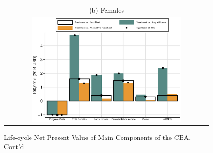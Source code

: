 \documentclass[static]{JJH-Beamer}
\begin{document}
\clearpage
\begin{frame}

\begin{figure}[H]
\addtocounter{figure}{-1}
\caption{Life-cycle Net Present Value of Main Components of the CBA, Cont'd}\label{fig:npvsgender}
\begin{center}
\begin{tabular}{c}
(b) Females\\
\includegraphics[width=0.75\textwidth]{output/abccare_npvs1.eps}
\end{tabular}
\end{center}
\end{figure}

\end{frame}

\clearpage
\end{document}
